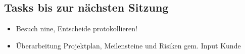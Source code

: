 \documentclass[class=scrbook,crop=false]{standalone}
\begin{document}
    \subsection*{Tasks bis zur nächsten Sitzung}
    
    \begin{itemize}
        \item Besuch nine, Entscheide protokollieren!
        \item Überarbeitung Projektplan, Meilensteine und Risiken gem. Input Kunde
    \end{itemize}
\end{document}

